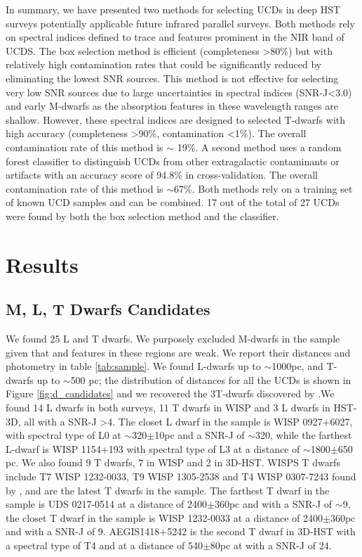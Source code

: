 \documentclass[manuscript]{aastex}
\begin{document}

In summary, we have presented two methods for selecting UCDs in deep HST surveys potentially applicable future infrared parallel surveys. Both methods rely on spectral indices defined to trace \wat and \meth features prominent in the NIR band of UCDS. The box selection method is efficient (completeness \textgreater 80\%) but with relatively high contamination rates that could be significantly reduced by eliminating the lowest SNR sources. This method is not effective for selecting very low SNR sources due to large uncertainties in spectral indices (SNR-J\textless 3.0) and early M-dwarfs as the absorption features in these wavelength ranges are shallow. However, these spectral indices are designed to selected T-dwarfs with high accuracy (completeness \textgreater 90\%, contamination \textless 1\%). The overall contamination rate of this method is $\sim$ 19\%. A second method uses a random forest classifier to distinguish UCDs from other extragalactic contaminants or artifacts with an accuracy score of 94.8\% in cross-validation. The overall contamination rate of this method is $\sim$67\%. Both methods rely on a training set of known UCD samples and can be combined. 17 out of the total of 27 UCDs were found by both the box selection method and the classifier. 


\section {Results}\label{sec:results}
\subsection{M, L, T Dwarfs Candidates}  \label{candidates}

We found 25 L and T dwarfs. We purposely excluded M-dwarfs in the sample given that \wat and \meth features in these regions are weak. We report their distances and photometry in table \ref{tab:sample}. We found L-dwarfs up to $\sim$1000pc, and T-dwarfs up to $\sim$500 pc; the distribution of distances for all the UCDs is shown in Figure \ref{fig:d_candidates} and we recovered the 3T-dwarfs discovered by \citealt{2012ApJ...752L..14M}.We found 14 L dwarfs in both surveys, 11 T dwarfs in WISP and 3 L dwarfs in HST-3D, all with a SNR-J \textgreater4. The closet L dwarf in the sample is WISP 0927+6027, with spectral type of L0 at $\sim$320$\pm$10pc and a SNR-J of $\sim$320, while the farthest L-dwarf is WISP 1154+193 with spectral type of L3 at a distance of $\sim$1800$\pm$650 pc. We also found 9 T dwarfs, 7 in WISP and 2 in 3D-HST. WISPS T dwarfs include T7 WISP 1232-0033, T9 WISP 1305-2538 and T4 WISP 0307-7243 found by \citealt{2012ApJ...752L..14M}, and are the latest T dwarfs in the sample. The farthest T dwarf in the sample is UDS 0217-0514 at a distance of 2400$\pm$360pc and with a SNR-J of $\sim$9, the closet T dwarf in the sample is WISP 1232-0033 at a distance of 2400$\pm$360pc and with a SNR-J of 9. AEGIS1418+5242 is the second T dwarf in 3D-HST with a spectral type of T4 and at a distance of 540$\pm$80pc at with a SNR-J of 24.
\end{document}

